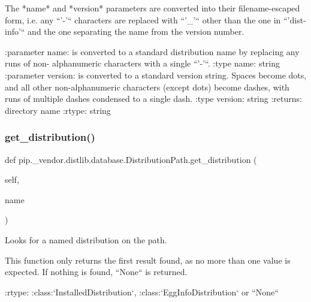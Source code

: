 \begin{DoxyVerb}The *name* and *version* parameters are converted into their
filename-escaped form, i.e. any ``'-'`` characters are replaced
with ``'_'`` other than the one in ``'dist-info'`` and the one
separating the name from the version number.

:parameter name: is converted to a standard distribution name by replacing
         any runs of non- alphanumeric characters with a single
         ``'-'``.
:type name: string
:parameter version: is converted to a standard version string. Spaces
            become dots, and all other non-alphanumeric characters
            (except dots) become dashes, with runs of multiple
            dashes condensed to a single dash.
:type version: string
:returns: directory name
:rtype: string\end{DoxyVerb}
 \mbox{\label{classpip_1_1__vendor_1_1distlib_1_1database_1_1DistributionPath_af76df55542d7cd100793ca54b893c808}} 
\subsubsection{\texorpdfstring{get\+\_\+distribution()}{get\_distribution()}}
{\footnotesize\ttfamily def pip.\+\_\+vendor.\+distlib.\+database.\+Distribution\+Path.\+get\+\_\+distribution (\begin{DoxyParamCaption}\item[{}]{self,  }\item[{}]{name }\end{DoxyParamCaption})}

\begin{DoxyVerb}Looks for a named distribution on the path.

This function only returns the first result found, as no more than one
value is expected. If nothing is found, ``None`` is returned.

:rtype: :class:`InstalledDistribution`, :class:`EggInfoDistribution`
or ``None``
\end{DoxyVerb}
 \mbox{\label{classpip_1_1__vendor_1_1distlib_1_1database_1_1DistributionPath_a7648bdf2f1bf2a7e9f9e55aea3e1b1b3}} 

